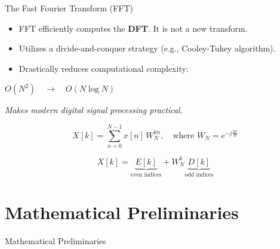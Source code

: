 \documentclass[aspectratio=169,xcolor=dvipsnames,svgnames,x11names,fleqn]{beamer}
\begin{document}
\begin{frame}{The Fast Fourier Transform (FFT)}
  \vspace{0.1cm}
  
  \begin{itemize}
    \setlength\itemsep{0.3em} 
    \item FFT efficiently computes the \textbf{DFT}. It is not a new transform.
    \item Utilizes a divide-and-conquer strategy (e.g., Cooley-Tukey algorithm).
    \item Drastically reduces computational complexity:
  \end{itemize}

  \vspace{0.2cm}
  \begin{center}
    {\Large $O(N^2) \quad \longrightarrow \quad O(N \log N)$}
  \end{center}

  \begin{flushright}
    \footnotesize\textit{Makes modern digital signal processing practical.}
  \end{flushright}
  
   \begin{equation*}
    X[k] = \sum_{n=0}^{N-1} x[n] \, W_N^{kn}, \quad \text{where } W_N = e^{-j \frac{2\pi}{N}}
  \end{equation*}

  \vspace{0.05cm}
  
  \begin{equation*}
    X[k] = \underbrace{E[k]}_{\text{even indices}} + W_N^k \underbrace{D[k]}_{\text{odd indices}}
  \end{equation*}


\end{frame}



\section{Mathematical Preliminaries}


\begin{frame}{}
    \begin{center}
    \Huge \bf \color{DarkBlue}
    \faCalculator
    
    Mathematical Preliminaries
\end{center}
\end{frame}
\end{document}
